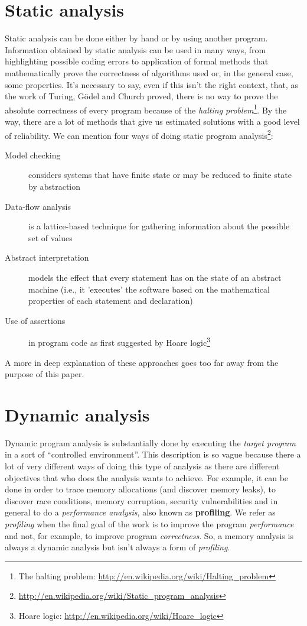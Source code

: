 \documentclass[a4paper,11pt]{report}
\begin{document}
\section{Static analysis}

Static analysis can be done either by hand or by using another program. Information obtained by static analysis can be used in many ways, from highlighting possible coding errors to application of formal methods that mathematically prove the correctness of algorithms used or, in the general case, some properties. It's necessary to say, even if this isn't the right context, that, as 
the work of Turing, G\"{o}del and Church proved, there is no way to prove the absolute correctness of every program because of the \emph{halting problem}\footnote{The halting problem: \url{http://en.wikipedia.org/wiki/Halting_problem}}.
By the way, there are a lot of methods that give us estimated solutions with a good level of reliability. We can mention four ways of doing static program
analysis\footnote{\url{http://en.wikipedia.org/wiki/Static_program_analysis}}:


\begin{description}
\item[Model checking] considers systems that have finite state or may be reduced to finite state by abstraction
\item[Data-flow analysis] is a lattice-based technique for gathering information about the possible set of values
\item[Abstract interpretation] models the effect that every statement has on the state of an abstract machine (i.e., it 'executes' the software based on the mathematical properties of each statement and declaration)
\item[Use of assertions] in program code as first suggested by Hoare logic\footnote{Hoare logic: \url{http://en.wikipedia.org/wiki/Hoare_logic}}
\end{description}

A more in deep explanation of these approaches goes too far away from the purpose of this paper.

\section{Dynamic analysis}

Dynamic program analysis is substantially done by executing the \emph{target program} in a sort of ``controlled environment''.
This description is so vague because there a lot of very different ways of doing this type of analysis as there are different objectives that who does the analysis wants to achieve. For example, it can be done in order to trace memory allocations (and discover memory leaks), to discover race conditions, memory corruption, security vulnerabilities and in general to do a \emph{performance analysis}, also known as \textbf{profiling}. We refer as \emph{profiling} when the final goal of the work is to improve the program  \emph{performance} and not, for example, to improve program \emph{correctness}. So, a memory analysis is always a dynamic analysis but isn't always a form of \emph{profiling}.
\end{document}

